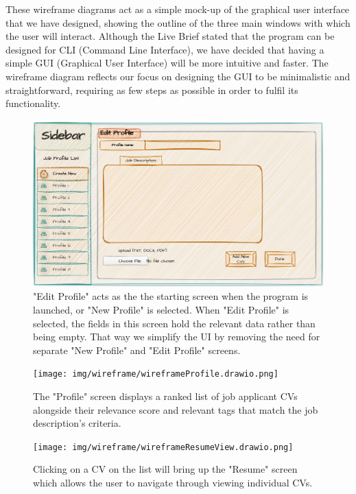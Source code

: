These wireframe diagrams act as a simple mock-up of the graphical user interface that we have designed, showing the outline of the three main windows with which the user will interact. Although the Live Brief stated that the program can be designed for CLI (Command Line Interface), we have decided that having a simple GUI (Graphical User Interface) will be more intuitive and faster. The wireframe diagram reflects our focus on designing the GUI to be minimalistic and straightforward, requiring as few steps as possible in order to fulfil its functionality. 
\begin{figure}[h]
    \centering
    \includegraphics[width=1\linewidth]{img/wireframe/wireframeCreateProfile.drawio.png}
    \caption{"Edit Profile" acts as the the starting screen when the program is launched, or "New Profile" is selected. When "Edit Profile" is selected, the fields in this screen hold the relevant data rather than being empty. That way we simplify the UI by removing the need for separate "New Profile" and "Edit Profile" screens.}
\end{figure}
\begin{figure}[h]
    \centering
    \texttt{[image: img/wireframe/wireframeProfile.drawio.png]}
    \caption{The "Profile" screen displays a ranked list of job applicant CVs alongside their relevance score and relevant tags that match the job description's criteria.}
\end{figure}
\begin{figure}[h]
    \centering
    \texttt{[image: img/wireframe/wireframeResumeView.drawio.png]}
    \caption{Clicking on a CV on the list will bring up the "Resume" screen which allows the user to navigate through viewing individual CVs.}
\end{figure}
